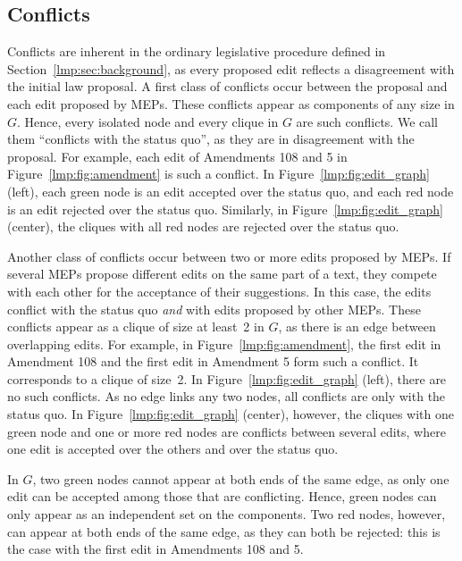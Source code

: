 \subsection{Conflicts}

Conflicts are inherent in the ordinary legislative procedure defined in Section~\ref{lmp:sec:background}, as every proposed edit reflects a disagreement with the initial law proposal.
A first class of conflicts occur between the proposal and each edit proposed by MEPs.
These conflicts appear as components of any size in $G$.
Hence, every isolated node and every clique in $G$ are such conflicts.
We call them ``conflicts with the status quo'', as they are in disagreement with the proposal.
For example, each edit of Amendments 108 and 5 in Figure~\ref{lmp:fig:amendment} is such a conflict.
In Figure~\ref{lmp:fig:edit_graph} (left), each green node is an edit accepted over the status quo, and each red node is an edit rejected over the status quo.
Similarly, in Figure~\ref{lmp:fig:edit_graph} (center), the cliques with all red nodes are rejected over the status quo.

Another class of conflicts occur between two or more edits proposed by MEPs.
If several MEPs propose different edits on the same part of a text, they compete with each other for the acceptance of their suggestions.
In this case, the edits conflict with the status quo \textit{and} with edits proposed by other MEPs.
These conflicts appear as a clique of size at least~2 in $G$, as there is an edge between overlapping edits.
For example, in Figure~\ref{lmp:fig:amendment}, the first edit in Amendment 108 and the first edit in Amendment 5 form such a conflict.
It corresponds to a clique of size~2.
In Figure~\ref{lmp:fig:edit_graph} (left), there are no such conflicts.
As no edge links any two nodes, all conflicts are only with the status quo.
In Figure~\ref{lmp:fig:edit_graph} (center), however, the cliques with one green node and one or more red nodes are conflicts between several edits, where one edit is accepted over the others and over the status quo.

In $G$, two green nodes cannot appear at both ends of the same edge, as only one edit can be accepted among those that are conflicting.
Hence, green nodes can only appear as an independent set on the components.
Two red nodes, however, can appear at both ends of the same edge, as they can both be rejected: this is the case with the first edit in Amendments 108 and 5.

